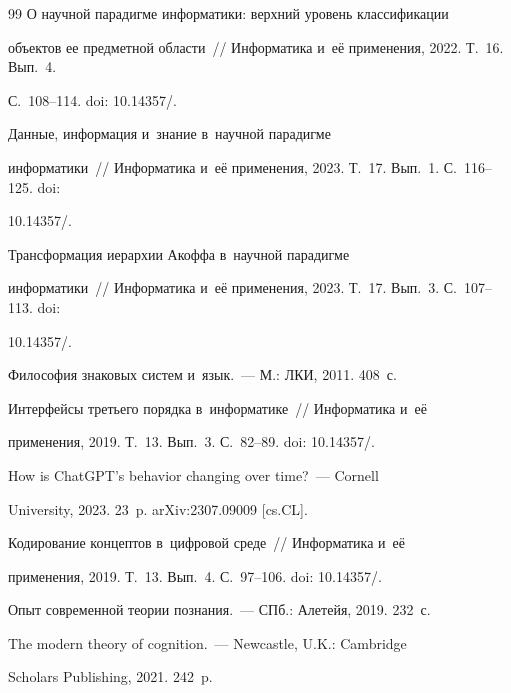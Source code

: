 {{\begin{thebibliography}{99}
 О научной парадигме информатики: верхний уровень классификации 

объектов ее предметной области~/\!\!/ Информатика и~её применения, 2022. Т.~16. Вып.~4. 

С.~108--114. doi: 10.14357\!/.


 Данные, информация и~знание в~научной парадигме 

информатики~/\!\!/ Информатика и~её применения, 2023. Т.~17. Вып.~1. С.~116--125. doi: 

10.14357\!/.


 Трансформация иерархии Акоффа в~научной парадигме 

информатики~/\!\!/ Информатика и~её применения, 2023. Т.~17. Вып.~3. С.~107--113. doi: 

10.14357\!/.




  Философия знаковых систем и~язык.~--- М.: ЛКИ, 2011. 408~с.


 Интерфейсы третьего порядка в~информатике~/\!\!/ Информатика и~её 

применения, 2019. Т.~13. Вып.~3. С.~82--89. doi: 10.14357\!/.


 How is ChatGPT's behavior changing over time?~--- Cornell 

University, 2023. 23~p. arXiv:2307.09009 [cs.CL].


 Кодирование концептов в~цифровой среде~/\!\!/ Информатика и~её 

применения, 2019. Т.~13. Вып.~4. С.~97--106. doi: 10.14357\!/.


 Опыт современной теории познания.~--- СПб.: Алетейя, 2019. 232~с.


 The modern theory of cognition.~--- Newcastle, U.K.: Cambridge 

Scholars Publishing, 2021. 242~p.


\end{thebibliography}}}
